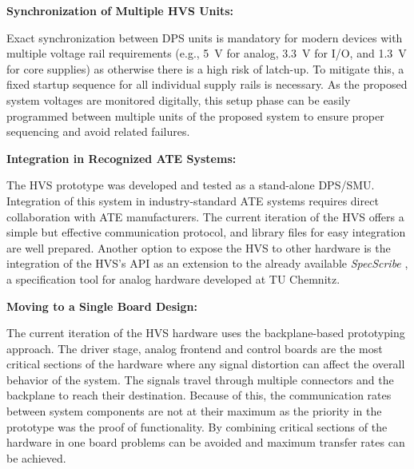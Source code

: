 \noindent\textbf{Synchronization of Multiple \acs{HVS} Units:}

Exact synchronization between \acs{DPS} units is mandatory
for modern devices with multiple voltage rail requirements (e.g., \SI{5}{\volt}
for analog, \SI{3.3}{\volt} for I/O, and \SI{1.3}{\volt}
for core supplies) as otherwise there is a high risk of latch-up.
To mitigate this, a fixed startup sequence for all individual supply rails is
necessary.
As the proposed system voltages are monitored digitally, this setup phase can
be easily programmed between multiple units of the proposed system to ensure
proper sequencing and avoid related failures.

\noindent\textbf{Integration in Recognized ATE Systems:}

The \acs{HVS} prototype was developed and tested as a stand-alone
\acs{DPS}/\acs{SMU}.
Integration of this system in industry-standard \ac{ATE} systems requires
direct collaboration with \acs{ATE} manufacturers.
The current iteration of the \acs{HVS} offers a simple but effective communication
protocol, and library files for easy integration are well prepared.
Another option to expose the \acs{HVS} to other hardware is the integration of
the \acs{HVS}'s \acs{API} as an extension to the already available
\emph{SpecScribe} \autocite{markert, schott}, a specification tool for analog
hardware developed at TU Chemnitz.

\noindent\textbf{Moving to a Single Board Design:}

The current iteration of the \acs{HVS} hardware uses the backplane-based
prototyping approach. The driver stage, analog frontend and control boards
are the most critical sections of the hardware where any signal distortion can
affect the overall behavior of the system.
The signals travel through multiple connectors and the backplane to
reach their destination.
Because of this, the communication rates between system components are not
at their maximum as the priority in the prototype was
the proof of functionality.
By combining critical sections of the hardware in one board problems can
be avoided and maximum transfer rates can be achieved.



